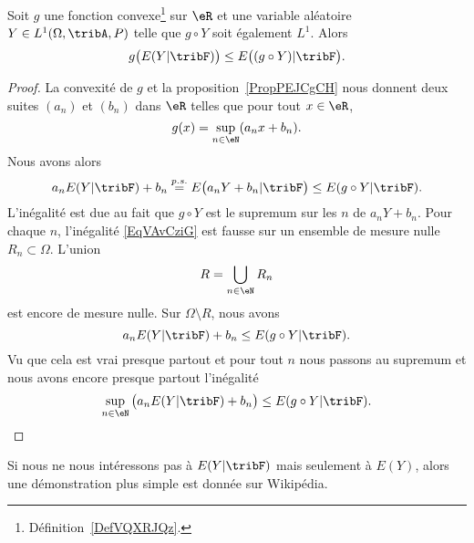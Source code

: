 \begin{proposition}    \label{PropABtKbBo}
	Soit \( g\) une fonction convexe\footnote{Définition~\ref{DefVQXRJQz}.} sur \( \eR\) et une variable aléatoire \( Y\in L^1(\Omega,\tribA,P)\) telle que \( g\circ Y\) soit également \( L^1\). Alors
	\begin{equation}
		g\big( E(Y|\tribF) \big)\leq E\big( (g\circ Y)|\tribF \big).
	\end{equation}
\end{proposition}

\begin{proof}
	La convexité de \( g\) et la proposition~\ref{PropPEJCgCH} nous donnent deux suites \( (a_n)\) et \( (b_n)\) dans \( \eR\) telles que pour tout \( x\in \eR\),
	\begin{equation}
		g(x)=\sup_{n\in \eN}(a_nx+b_n).
	\end{equation}
	Nous avons alors
	\begin{equation}    \label{EqVAvCziG}
		a_nE(Y|\tribF)+b_n\stackrel{p.s.}{=}E\big( a_nY+b_n|\tribF \big)\leq  E(g\circ Y|\tribF).
	\end{equation}
	L'inégalité est due au fait que \( g\circ Y\) est le supremum sur les \( n\) de \( a_nY+b_n\). Pour chaque \( n\), l'inégalité \eqref{EqVAvCziG} est fausse sur un ensemble de mesure nulle \( R_n\subset\Omega\). L'union
	\begin{equation}
		R=\bigcup_{n\in \eN}R_n
	\end{equation}
	est encore de mesure nulle. Sur \( \Omega\setminus R\), nous avons
	\begin{equation}
		a_nE(Y|\tribF)+b_n\leq E(g\circ Y|\tribF).
	\end{equation}
	Vu que cela est vrai presque partout et pour tout \( n\) nous passons au supremum et nous avons encore presque partout l'inégalité
	\begin{equation}
		\sup_{n\in\eN}\big( a_nE(Y|\tribF)+b_n \big)\leq E(g\circ Y|\tribF).
	\end{equation}
\end{proof}

Si nous ne nous intéressons pas à \( E(Y|\tribF)\) mais seulement à \( E(Y)\), alors une démonstration plus simple est donnée sur Wikipédia\cite{YMmJevi}.

